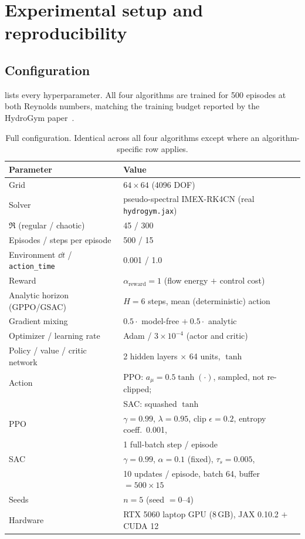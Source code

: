 \section{Experimental setup and reproducibility}
\label{sec:setup}

\subsection{Configuration}

 lists every hyperparameter. All four algorithms are trained
for \num{500} episodes at both Reynolds numbers, matching the training budget
reported by the HydroGym paper~\cite{hydrogym2026}.

\begin{table}[t]
\centering
\caption{Full configuration. Identical across all four algorithms except
where an algorithm-specific row applies.}
\label{tab:config}
\small
\setlength{\tabcolsep}{4pt}
\begin{tabular}{|l|l|}
\hline
Parameter & Value \\
\hline
Grid & $64\times 64$ (4096 DOF) \\
\hline
Solver & pseudo-spectral IMEX-RK4CN (real \texttt{hydrogym.jax}) \\
\hline
$\Re$ (regular / chaotic) & 45 / 300 \\
\hline
Episodes / steps per episode & 500 / 15 \\
\hline
Environment $\dd t$ / \texttt{action\_time} & 0.001 / 1.0 \\
\hline
Reward & $\alpha_{\text{reward}}=1$ (flow energy $+$ control cost) \\
\hline
Analytic horizon (GPPO/GSAC) & $H=6$ steps, mean (deterministic) action \\
\hline
Gradient mixing & $0.5\cdot$ model-free $+\ 0.5\cdot$ analytic \\
\hline
Optimizer / learning rate & Adam / $3\times 10^{-4}$ (actor and critic) \\
\hline
Policy / value / critic network & 2 hidden layers $\times$ 64 units, $\tanh$ \\
\hline
Action & PPO: $a_\mu=0.5\tanh(\cdot)$, sampled, not re-clipped;\\
       & SAC: squashed $\tanh$ \\
\hline
PPO & $\gamma{=}0.99$, $\lambda{=}0.95$, clip $\epsilon{=}0.2$, entropy coeff.\ 0.001,\\
    & 1 full-batch step / episode \\
\hline
SAC & $\gamma{=}0.99$, $\alpha{=}0.1$ (fixed), $\tau_s{=}0.005$,\\
    & 10 updates / episode, batch 64, buffer $= 500\times 15$ \\
\hline
Seeds & $n=5$ (seed $=0$--$4$) \\
\hline
Hardware & RTX 5060 laptop GPU (8\,GB), JAX 0.10.2 $+$ CUDA 12 \\
\hline
\end{tabular}
\end{table}

